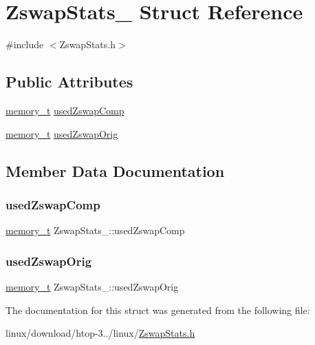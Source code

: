 \hypertarget{structZswapStats__}{}\section{Zswap\+Stats\+\_\+ Struct Reference}
\label{structZswapStats__}


{\ttfamily \#include $<$Zswap\+Stats.\+h$>$}

\subsection*{Public Attributes}
\begin{DoxyCompactItemize}
\item 
\hyperlink{Machine_8h_ac8c2c5995f64727051f4034a810e5b07}{memory\+\_\+t} \hyperlink{structZswapStats___a52bba235ea36f661eee25b98f03718cb}{used\+Zswap\+Comp}
\item 
\hyperlink{Machine_8h_ac8c2c5995f64727051f4034a810e5b07}{memory\+\_\+t} \hyperlink{structZswapStats___a278b75c6b4830d10234c74337bb9f0c6}{used\+Zswap\+Orig}
\end{DoxyCompactItemize}


\subsection{Member Data Documentation}
\mbox{\label{structZswapStats___a52bba235ea36f661eee25b98f03718cb}} 
\subsubsection{\texorpdfstring{used\+Zswap\+Comp}{usedZswapComp}}
{\footnotesize\ttfamily \hyperlink{Machine_8h_ac8c2c5995f64727051f4034a810e5b07}{memory\+\_\+t} Zswap\+Stats\+\_\+\+::used\+Zswap\+Comp}

\mbox{\label{structZswapStats___a278b75c6b4830d10234c74337bb9f0c6}} 
\subsubsection{\texorpdfstring{used\+Zswap\+Orig}{usedZswapOrig}}
{\footnotesize\ttfamily \hyperlink{Machine_8h_ac8c2c5995f64727051f4034a810e5b07}{memory\+\_\+t} Zswap\+Stats\+\_\+\+::used\+Zswap\+Orig}



The documentation for this struct was generated from the following file\+:\begin{DoxyCompactItemize}
\item 
linux/download/htop-\/3../linux/\hyperlink{ZswapStats_8h}{Zswap\+Stats.\+h}\end{DoxyCompactItemize}
